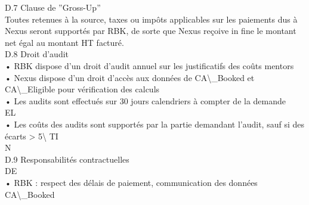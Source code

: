 \documentclass[12pt,landscape,a4paper]{article}
\begin{document}
\vspace{0.5em}
\vspace{0.5em}
D.7 Clause de ”Gross-Up”\\
Toutes retenues à la source, taxes ou impôts applicables sur les paiements dus à Nexus seront supportés par RBK, de sorte que Nexus reçoive in fine le montant\\
net égal au montant HT facturé.\\
\vspace{0.5em}
\vspace{0.5em}
\vspace{0.5em}
D.8 Droit d’audit\\
• RBK dispose d’un droit d’audit annuel sur les justificatifs des coûts mentors\\
\vspace{0.5em}
• Nexus dispose d’un droit d’accès aux données de CA\textbackslash{}_Booked et CA\textbackslash{}_Eligible pour vérification des calculs\\
\vspace{0.5em}
• Les audits sont effectués sur 30 jours calendriers à compter de la demande\\
\vspace{0.5em}
\vspace{0.5em}
\vspace{0.5em}
\vspace{0.5em}
EL\\
• Les coûts des audits sont supportés par la partie demandant l’audit, sauf si des écarts \textgreater{} 5\textbackslash{}%
\vspace{0.5em}
\vspace{0.5em}
\vspace{0.5em}
\vspace{0.5em}
TI\\
N\\
D.9 Responsabilités contractuelles\\
\vspace{0.5em}
\vspace{0.5em}
\vspace{0.5em}
\vspace{0.5em}
DE\\
• RBK : respect des délais de paiement, communication des données CA\textbackslash{}_Booked\\
\vspace{0.5em}
\vspace{0.5em}
\vspace{0.5em}
\end{document}
